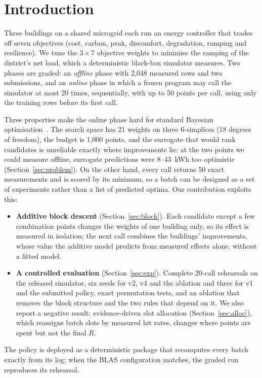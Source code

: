 \section{Introduction}
\label{sec:intro}
Three buildings on a shared microgrid each run an energy controller that trades off seven objectives (cost,
carbon, peak, discomfort, degradation, ramping and resilience). We tune the $3\times7$ objective weights to
minimise the ramping of the district's net load, which a deterministic black-box simulator measures. Two phases
are graded: an \emph{offline} phase with 2,048 measured rows and two submissions, and an \emph{online} phase in which a
frozen program may call the simulator at most 20 times, sequentially, with up to 50 points per call, using only the
training rows before its first call.

Three properties make the online phase hard for standard Bayesian optimisation~\cite{rasmussen,turbo}. The search
space has 21 weights on three 6-simplices (18 degrees of freedom), the budget is 1,000 points, and the surrogate that would rank
candidates is unreliable exactly where improvements lie: at the two points we could measure offline, surrogate
predictions were 8--43~kWh too optimistic (Section~\ref{sec:problem}). On the other hand, every call returns 50 exact
measurements and is scored by its minimum, so a batch can be designed as a set of experiments rather than a list of
predicted optima. Our contribution exploits this:
\begin{itemize}
\item \textbf{Additive block descent} (Section~\ref{sec:block}). Each candidate except a few combination points
changes the weights of one building only, so its effect is measured in isolation; the next call combines the buildings' improvements, whose value the
additive model predicts from measured effects alone, without a fitted model.
\item \textbf{A controlled evaluation} (Section~\ref{sec:exp}). Complete 20-call rehearsals on the released simulator,
six seeds for v2, v4 and the ablation and three for v1 and the submitted policy, exact permutation tests, and an
ablation that removes the block structure and the two rules that depend on it. We also
report a negative result: evidence-driven slot allocation (Section~\ref{sec:alloc}), which reassigns batch slots by
measured hit rates, changes where points are spent but not the final $R$.
\end{itemize}
The policy is deployed as a deterministic package that recomputes every batch exactly from its log; when the BLAS
configuration matches, the graded run reproduces its rehearsal.
